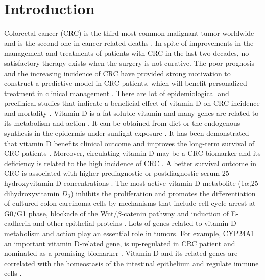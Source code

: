 \documentclass[fleqn,10pt]{SelfArx} %
\affiliation{\textsuperscript{1}\textit{diego.barqueromorera@studenti.unitn.it}} %
\affiliation{\textsuperscript{2}\textit{giacomo.fantoni@studenti.unitn.it}} %
\affiliation{\textsuperscript{3}\textit{gaia.faggin@studenti.unitn.it}} %
\affiliation{\textsuperscript{4}\textit{leonardo.golinelli@studenti.unitn.it}} %
\begin{document}
\maketitle %

\tableofcontents %

\thispagestyle{empty} %


\section{Introduction}
	Colorectal cancer (CRC) is the third most common malignant tumor worldwide and is the second one in cancer-related deaths \cite{Ferlay2018-pg}. In spite of improvements in the management and treatments of patients with CRC in the last two decades, no satisfactory therapy exists when the surgery is not curative. The poor prognosis and the increasing incidence of CRC have provided strong motivation to construct a predictive model in CRC patients, which will benefit personalized treatment in clinical management \cite{Bu2021-xn}. There are lot of epidemiological and preclinical studies that indicate a beneficial effect of vitamin D on CRC incidence and mortality \cite{Pereira2012-pf} \cite{Giovannucci2013-ss}. Vitamin D is a fat-soluble vitamin and many genes are related to its metabolism and action \cite{Fedirko2019-ai}. It can be obtained from diet or the endogenous synthesis in the epidermis under sunlight exposure \cite{Saraff2016-dr}. It has been demonstrated that vitamin D benefits clinical outcome and improves the long-term survival of CRC patients \cite{Xu2021-vb}. Moreover, circulating vitamin D may be a CRC biomarker and its deficiency is related to the high incidence of CRC \cite{Meeker2016-tr}. A better survival outcome in CRC is associated with higher prediagnostic or postdiagnostic serum 25-hydroxyvitamin D concentrations \cite{Zgaga2014-dd}. The most active vitamin D metabolite (1$\alpha$,25-dihydroxyvitamin $D_3$) inhibits the proliferation and promotes the differentiation of cultured colon carcinoma cells by mechanisms that include cell cycle arrest at G0/G1 phase, blockade of the Wnt/$\beta$-catenin pathway and induction of E-cadherin and other epithelial proteins \cite{Pereira2012-pf} \cite{Feldman2014-mh} \cite{Palmer2001-bh}. Lots of genes related to vitamin D metabolism and action play an essential role in tumors. For example, CYP24A1 an important vitamin D-related gene, is up-regulated in CRC patient and nominated as a promising biomarker \cite{Sadeghi2020-ci}. Vitamin D and its related genes are correlated with the homeostasis of the intestinal epithelium and regulate immune cells \cite{Martinez-Romero2018-gp}.
\end{document}
